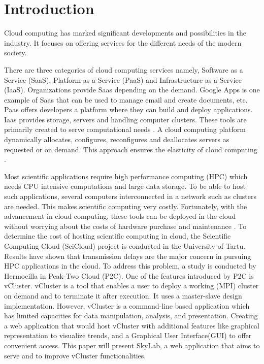
\section{Introduction}

Cloud computing has marked significant developments and possibilities in the industry. It focuses on offering services for the different needs of the modern society.


There are three categories of cloud computing services namely, Software as a Service (SaaS), Platform as a Service (PaaS) and Infrastructure as a Service (IaaS). Organizations provide Saas depending on the demand. Google Apps is one example of Saas that can be used to manage email and create documents, etc. Paas offers developers a platform where they can build and deploy applications. Iaas provides storage, servers and handling computer clusters. These tools are primarily created to serve computational needs \cite {Ahuja2012}. A cloud computing platform dynamically allocates, configures, reconfigures and deallocates servers as requested or on demand. This approach ensures the elasticity of cloud computing \cite {Brandic2011}.


Most scientific applications require high performance computing (HPC) which needs CPU intensive computations and large data storage. To be able to host such applications, several computers interconnected in a network such as clusters are needed. This makes scientific computing very costly. Fortunately, with the advancement in cloud computing, these tools can be deployed in the cloud without worrying about the costs of hardware purchase and maintenance \cite {Ahuja2012}. To determine the cost of hosting scientific computing in cloud, the Scientific Computing Cloud (SciCloud) project is conducted in the University of Tartu. Results have shown that transmission delays are the major concern in pursuing HPC applications in the cloud\cite {Brandic2011}.  To address this problem, a study is conducted by Hermocilla\cite {Hermocilla2014} in Peak-Two Cloud (P2C). One of the features introduced by P2C is vCluster. vCluster is a tool that enables a user to deploy a working (MPI) cluster on demand and to terminate it after execution. It uses a master-slave design implementation. However, vCluster is a command-line based application which has limited capacities for data manipulation, analysis, and presentation. Creating a web application that would host vCluster with additional features like graphical representation to visualize trends, and a Graphical User Interface(GUI) to offer convenient access. This paper will present SkyLab, a web application that aims to serve and to improve vCluster functionalities.

